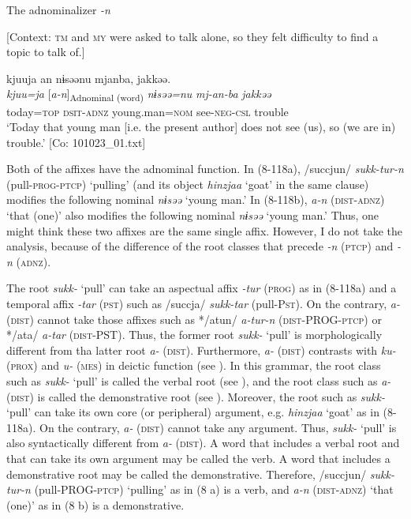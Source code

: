 \ex The adnominalizer \textit{-n}

  [Context: \textsc{tm} and \textsc{my} were asked to talk alone, so they felt difficulty to find a topic to talk of.]

  {\TM}
\glll   kjuuja  an  nɨsəənu  mjanba,  jakkəə.\\
\textit{kjuu=ja}  [\textit{a-n}]\textsubscript{Adnominal (word)}  \textit{nɨsəə=nu}  \textit{mj-an-ba}  \textit{jakkəə}\\
    today=\textsc{top}  \textsc{dsit}-\textsc{adnz}  young.man=\textsc{nom}  see-\textsc{neg}-\textsc{csl}  trouble\\
\glt ‘Today that young man [i.e. the present author] does not see (us), so (we are in) trouble.’   [Co: 101023\_01.txt]
\z
\z

Both of the affixes have the adnominal function. In (8\nobreakdash-118a), /succjun/ \textit{sukk-tur-n} (pull-\textsc{prog}-\textsc{ptcp}) ‘pulling’ (and its object \textit{hinzjaa} ‘goat’ in the same clause) modifies the following nominal \textit{nɨsəə} ‘young man.’ In (8\nobreakdash-118b), \textit{a-n} (\textsc{dist}-\textsc{adnz}) ‘that (one)’ also modifies the following nominal \textit{nɨsəə} ‘young man.’ Thus, one might think these two affixes are the same single affix. However, I do not take the analysis, because of the difference of the root classes that precede \textit{-n} (\textsc{ptcp}) and \textit{-n} (\textsc{adnz}).

The root \textit{sukk-} ‘pull’ can take an aspectual affix \textit{-tur} (\textsc{prog}) as in (8\nobreakdash-118a) and a temporal affix \textit{-tar} (\textsc{pst}) such as /succja/ \textit{sukk-tar} (pull-P\textsc{st}). On the contrary, \textit{a-} (\textsc{dist}) cannot take those affixes such as */atun/ \textit{a-tur-n} (\textsc{dist}-PROG-\textsc{ptcp}) or */ata/ \textit{a-tar} (\textsc{dist}-PST). Thus, the former root \textit{sukk-} ‘pull’ is morphologically different from tha latter root \textit{a-} (\textsc{dist}). Furthermore, \textit{a-} (\textsc{dist}) contrasts with \textit{ku-} (\textsc{prox}) and \textit{u-} (\textsc{mes}) in deictic function (see ). In this grammar, the root class such as \textit{sukk-} ‘pull’ is called the verbal root (see ), and the root class such as \textit{a-} (\textsc{dist}) is called the demonstrative root (see ). Moreover, the root such as \textit{sukk-} ‘pull’ can take its own core (or peripheral) argument, e.g. \textit{hinzjaa} ‘goat’ as in (8\nobreakdash-118a). On the contrary, \textit{a-} (\textsc{dist}) cannot take any argument. Thus, \textit{sukk-} ‘pull’ is also syntactically different from \textit{a-} (\textsc{dist}). A word that includes a verbal root and that can take its own argument may be called the verb. A word that includes a demonstrative root may be called the demonstrative. Therefore, /succjun/ \textit{sukk-tur-n} (pull-PROG-\textsc{ptcp}) ‘pulling’ as in (8 a) is a verb, and \textit{a-n} (\textsc{dist}-\textsc{adnz}) ‘that (one)’ as in (8 b) is a demonstrative.

